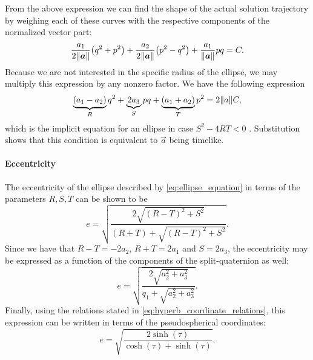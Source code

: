 From the above expression we can find the shape of the actual solution trajectory by weighing each of these curves with the respective components of the normalized vector part:
$$ \frac{a_1}{2\norm{\vec{a}}}\qty(q^2 + p^2)  + \frac{a_2}{2\norm{\vec{a}}}\qty(p^2 - q^2) + \frac{a_1}{\norm{\vec{a}}}pq = C. $$
Because we are not interested in the specific radius of the ellipse, we may multiply this expression by any nonzero factor. We have the following expression 
\begin{equation}
    \underbrace{(a_1 - a_2)}_{R} q^2 + \underbrace{2 a_3}_{S} pq + \underbrace{(a_1 + a_2)}_{T} p^2 = 2\norm{a}C,
    \label{eq:ellipse_equation}
\end{equation}
which is the implicit equation for an ellipse in case $S^2 - 4RT < 0$ \cite{Rapp1991}. Substitution shows that this condition is equivalent to $\vec{a}$ being timelike.

\paragraph{Eccentricity} The eccentricity of the ellipse described by \cref{eq:ellipse_equation} in terms of the parameters $R, S, T$ can be shown to be \cite{Rapp1991}
\begin{equation}
    e = \sqrt{\frac{2\sqrt{(R - T)^2 + S^2}}{(R + T) + \sqrt{(R - T)^2 + S^2}}}.
    \label{eq:eccentricity}
\end{equation}
Since we have that $R - T = -2a_2$, $R + T = 2a_1$ and $S = 2a_3$, the eccentricity may be expressed as a function of the components of the split-quaternion as well:
\begin{equation}
    e = \sqrt{\frac{2\sqrt{a_2^2 + a_3^2}}{q_1 + \sqrt{a_2^2 + a_3^2}}}.
\end{equation}
Finally, using the relations stated in \cref{eq:hyperb_coordinate_relations}, this expression can be written in terms of the pseudospherical coordinates:
\begin{equation}
    e = \sqrt{\frac{2\sinh(\tau)}{\cosh(\tau) + \sinh(\tau)}}. 
    \label{eq:e_pseudosphere_coords}
\end{equation}

